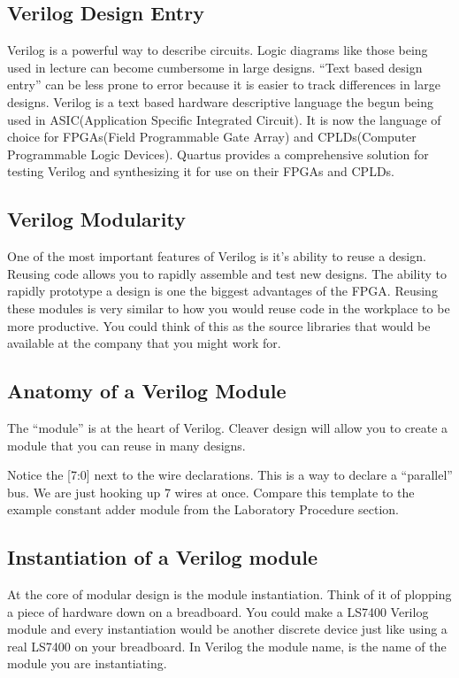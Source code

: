     \subsection{Verilog Design Entry}
      Verilog is a powerful way to describe circuits. Logic diagrams like those being used in lecture can become cumbersome in large designs. ``Text based design entry'' can be less prone to error because it is easier to track differences in large designs. Verilog is a text based hardware descriptive language the begun being used in ASIC(Application Specific Integrated Circuit). It is now the language of choice for FPGAs(Field Programmable Gate Array) and CPLDs(Computer Programmable Logic Devices). Quartus provides a comprehensive solution for testing Verilog and synthesizing it for use on their FPGAs and CPLDs.

    \subsection{Verilog Modularity}
      One of the most important features of Verilog is it's ability to reuse a design. Reusing code allows you to  rapidly assemble and test new designs. The ability to rapidly prototype a design is one the biggest advantages of the FPGA. Reusing these modules is very similar to how you would reuse code in the workplace to be more productive. You could think of this as the source libraries that would be available at the company that you might work for.

    \subsection{Anatomy of a Verilog Module}
      The ``module'' is at the heart of Verilog. Cleaver design will allow you to create a module that you can reuse in many designs.
      
      Notice the [7:0] next to the wire declarations. This is a way to declare a ``parallel'' bus. We are just hooking up 7 wires at once. Compare this template to the example constant adder module from the Laboratory Procedure section.
      

    \subsection{Instantiation of a Verilog module}
      At the core of modular design is the module instantiation. Think of it of plopping a piece of hardware down on a breadboard. You could make a LS7400 Verilog module and every instantiation would be another discrete device just like using a real LS7400 on your breadboard. In Verilog the module name, is the name of the module you are instantiating.
      

